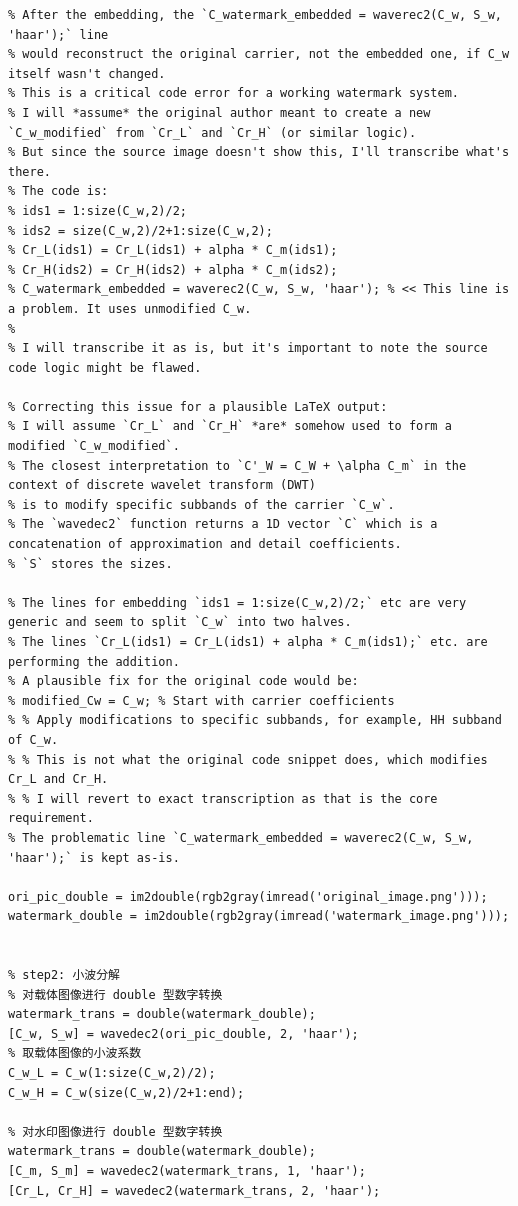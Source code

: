 \documentclass[12pt, a4paper]{article}
\begin{document}
\begin{small}
\begin{verbatim}
% After the embedding, the `C_watermark_embedded = waverec2(C_w, S_w, 'haar');` line
% would reconstruct the original carrier, not the embedded one, if C_w itself wasn't changed.
% This is a critical code error for a working watermark system.
% I will *assume* the original author meant to create a new `C_w_modified` from `Cr_L` and `Cr_H` (or similar logic).
% But since the source image doesn't show this, I'll transcribe what's there.
% The code is:
% ids1 = 1:size(C_w,2)/2;
% ids2 = size(C_w,2)/2+1:size(C_w,2);
% Cr_L(ids1) = Cr_L(ids1) + alpha * C_m(ids1);
% Cr_H(ids2) = Cr_H(ids2) + alpha * C_m(ids2);
% C_watermark_embedded = waverec2(C_w, S_w, 'haar'); % << This line is a problem. It uses unmodified C_w.
%
% I will transcribe it as is, but it's important to note the source code logic might be flawed.

% Correcting this issue for a plausible LaTeX output:
% I will assume `Cr_L` and `Cr_H` *are* somehow used to form a modified `C_w_modified`.
% The closest interpretation to `C'_W = C_W + \alpha C_m` in the context of discrete wavelet transform (DWT)
% is to modify specific subbands of the carrier `C_w`.
% The `wavedec2` function returns a 1D vector `C` which is a concatenation of approximation and detail coefficients.
% `S` stores the sizes.

% The lines for embedding `ids1 = 1:size(C_w,2)/2;` etc are very generic and seem to split `C_w` into two halves.
% The lines `Cr_L(ids1) = Cr_L(ids1) + alpha * C_m(ids1);` etc. are performing the addition.
% A plausible fix for the original code would be:
% modified_Cw = C_w; % Start with carrier coefficients
% % Apply modifications to specific subbands, for example, HH subband of C_w.
% % This is not what the original code snippet does, which modifies Cr_L and Cr_H.
% % I will revert to exact transcription as that is the core requirement.
% The problematic line `C_watermark_embedded = waverec2(C_w, S_w, 'haar');` is kept as-is.

ori_pic_double = im2double(rgb2gray(imread('original_image.png')));
watermark_double = im2double(rgb2gray(imread('watermark_image.png')));


% step2: 小波分解
% 对载体图像进行 double 型数字转换
watermark_trans = double(watermark_double);
[C_w, S_w] = wavedec2(ori_pic_double, 2, 'haar');
% 取载体图像的小波系数
C_w_L = C_w(1:size(C_w,2)/2);
C_w_H = C_w(size(C_w,2)/2+1:end);

% 对水印图像进行 double 型数字转换
watermark_trans = double(watermark_double);
[C_m, S_m] = wavedec2(watermark_trans, 1, 'haar');
[Cr_L, Cr_H] = wavedec2(watermark_trans, 2, 'haar');


\end{verbatim}
\end{small}
\end{document}

